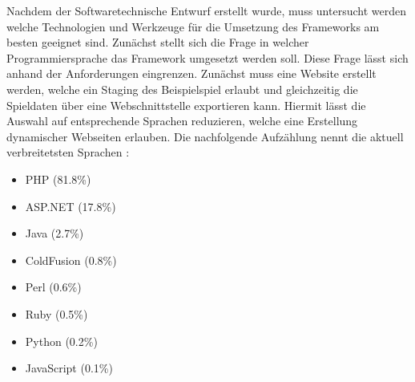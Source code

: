 Nachdem der Softwaretechnische Entwurf erstellt wurde, muss untersucht werden welche Technologien und Werkzeuge für die Umsetzung des Frameworks am besten geeignet sind.
Zunächst stellt sich die Frage in welcher Programmiersprache das Framework umgesetzt werden soll. Diese Frage lässt sich anhand der Anforderungen eingrenzen. Zunächst muss eine Website erstellt werden, welche ein Staging des Beispielspiel erlaubt und gleichzeitig die Spieldaten über eine Webschnittstelle exportieren kann. Hiermit lässt die Auswahl auf entsprechende Sprachen reduzieren, welche eine Erstellung dynamischer Webseiten erlauben.
Die nachfolgende Aufzählung nennt die aktuell verbreitetsten Sprachen \cite{WWWtechs.2014, Deitel.2008}:

\begin{itemize}
\item PHP (81.8\%)
\item ASP.NET (17.8\%)
\item Java (2.7\%)
\item ColdFusion (0.8\%)
\item Perl (0.6\%)
\item Ruby (0.5\%)
\item Python (0.2\%)
\item JavaScript (0.1\%)
\end{itemize}

